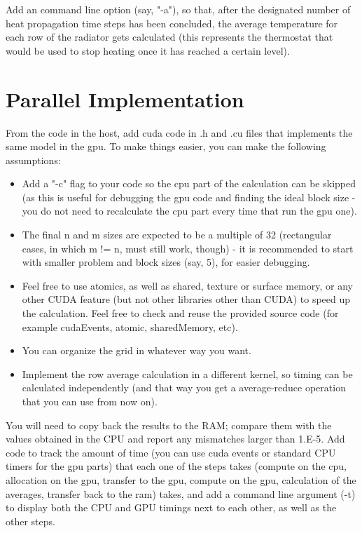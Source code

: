 \documentclass[a4paper, fleqn]{article}
\begin{document}
Add an command line option (say, "-a"), so that, after the designated number of heat propagation time steps has been concluded, the average temperature for each row of the radiator gets calculated (this represents the thermostat that would be used to stop heating once it has reached a certain level).

\section{Parallel Implementation}%
\label{sec:parallel_implementation}

From the code in the host, add cuda code in .h and .cu files that implements the same model in the gpu. To make things easier, you can make the following assumptions:

\begin{itemize}
        \item Add a "-c" flag to your code so the cpu part of the calculation can be skipped (as this is useful for debugging the gpu code and finding the ideal block size - you do not need to recalculate the cpu part every time that run the gpu one).
        \item The final n and m sizes are expected to be a multiple of 32 (rectangular cases, in which m != n, must still work, though) - it is recommended to start with smaller problem and block sizes (say, 5), for easier debugging.
        \item Feel free to use atomics, as well as shared, texture or surface memory, or any other CUDA feature (but not other libraries other than CUDA) to speed up the calculation. Feel free to check and reuse the provided source code (for example cudaEvents, atomic, sharedMemory, etc).
        \item You can organize the grid in whatever way you want.
        \item Implement the row average calculation in a different kernel, so timing can be calculated independently (and that way you get a average-reduce operation that you can use from now on).
\end{itemize}

You will need to copy back the results to the RAM; compare them with the values obtained in the CPU and report any mismatches larger than 1.E-5. Add code to track the amount of time (you can use cuda events or standard CPU timers for the gpu parts) that each one of the steps takes (compute on the cpu, allocation on the gpu, transfer to the gpu, compute on the gpu, calculation of the averages, transfer back to the ram) takes, and add a command line argument (-t) to display both the CPU and GPU timings next to each other, as well as the other steps.
\end{document}
